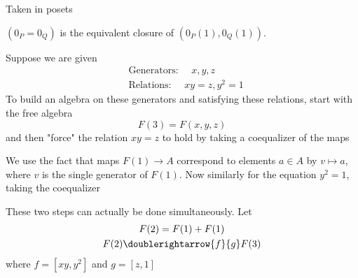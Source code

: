 \documentclass[11pt]{article}
\begin{document}
\begin{examplle}[]
Taken in posets
\begin{center}\end{center}
\((0_P=0_Q)\) is the equivalent closure of \((0_P(1),0_Q(1))\).
\end{examplle}

\begin{examplle}
Suppose we are given
\begin{align*}
&\text{Generators: }\quad x,y,z\\
&\text{Relations: }\quad xy=z,y^2=1
\end{align*}
To build an algebra on these generators and satisfying these relations, start
with the free algebra
\begin{equation*}
F(3)=F(x,y,z)
\end{equation*}
and then "force" the relation \(xy=z\) to hold by taking a coequalizer of the
maps
\begin{center}\end{center}
We use the fact that maps \(F(1)\to A\) correspond to elements \(a\in A\) by
\(v\mapsto a\), where \(v\) is the single generator of \(F(1)\). Now
similarly for the equation \(y^2=1\), taking the coequalizer
\begin{center}\end{center}
These two steps can actually be done simultaneously. Let
\begin{gather*}
 F(2)=F(1)+F(1)\\
 F(2)\doublerightarrow{f}{g}F(3)
\end{gather*}
where \(f=[xy,y^2]\) and \(g=[z,1]\)
\end{examplle}
\end{document}
